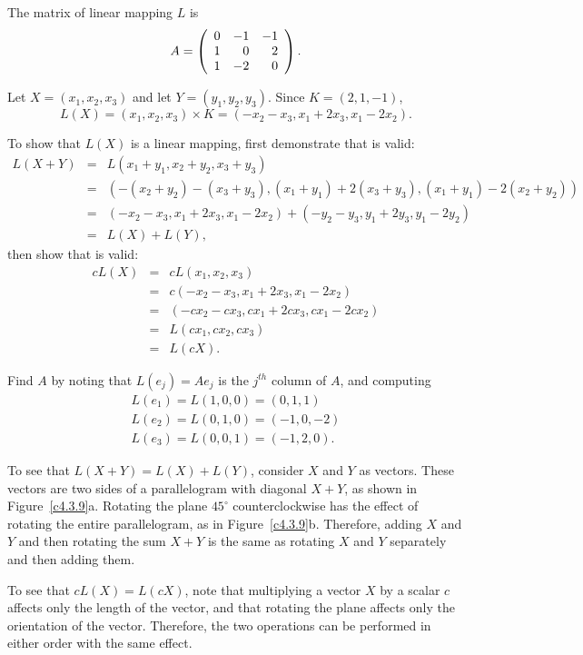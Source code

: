 \documentclass{ximera}
\begin{document}
\ans The matrix of linear mapping $L$ is
\[
A = \left(\begin{array}{rrr} 0 & -1 & -1 \\ 1 & 0 & 2 \\ 1 & -2 & 0\end{array}\right).
\]

\soln Let $X = (x_1,x_2,x_3)$ and let $Y = (y_1,y_2,y_3)$.  
Since $K = (2,1,-1)$,
\[
L(X) = (x_1,x_2,x_3) \times K = 
(-x_2 - x_3, x_1 + 2x_3, x_1 - 2x_2).
\]

To show that $L(X)$ is a linear mapping, first demonstrate that
 is valid:
\[
\begin{array}{rcl}
L(X + Y) & = & L(x_1 + y_1,x_2 + y_2,x_3 + y_3) \\
& = & (-(x_2 + y_2) - (x_3 + y_3), (x_1 + y_1) + 2(x_3 + y_3),
(x_1 + y_1) - 2(x_2 + y_2)) \\
& = & (-x_2 - x_3, x_1 + 2x_3, x_1 - 2x_2) +
(-y_2 - y_3, y_1 + 2y_3, y_1 - 2y_2) \\
& = & L(X) + L(Y), \end{array}
\]
then show that  is valid:
\[
\begin{array}{rcl}
cL(X) & = & cL(x_1,x_2,x_3) \\
& = & c(-x_2 - x_3, x_1 + 2x_3, x_1 - 2x_2) \\
& = & (-cx_2 - cx_3, cx_1 + 2cx_3, cx_1 - 2cx_2) \\
& = & L(cx_1,cx_2,cx_3) \\
& = & L(cX). \end{array}
\]

Find $A$ by noting that $L(e_j) = Ae_j$ is the $j^{th}$ column of $A$,
and computing
\[ \begin{array}{l}
L(e_1) = L(1,0,0) = (0,1,1) \\
L(e_2) = L(0,1,0) = (-1,0,-2) \\
L(e_3) = L(0,0,1) = (-1,2,0). \end{array} \]


To see that $L(X + Y) = L(X) + L(Y)$, consider $X$ and $Y$ as
vectors.  These vectors are two sides of a parallelogram with
diagonal $X + Y$, as shown in Figure~\ref{c4.3.9}a.  Rotating
the plane $45^\circ$ counterclockwise has the effect of
rotating the entire parallelogram, as in Figure~\ref{c4.3.9}b.
Therefore, adding $X$ and $Y$ and then rotating the sum
$X + Y$ is the same as rotating $X$ and $Y$ separately and
then adding them.

\para To see that $cL(X) = L(cX)$, note that multiplying a
vector $X$ by a scalar $c$ affects only the length of the vector,
and that rotating the plane affects only the orientation of
the vector.  Therefore, the two operations can be performed in
either order with the same effect.
\end{document}
